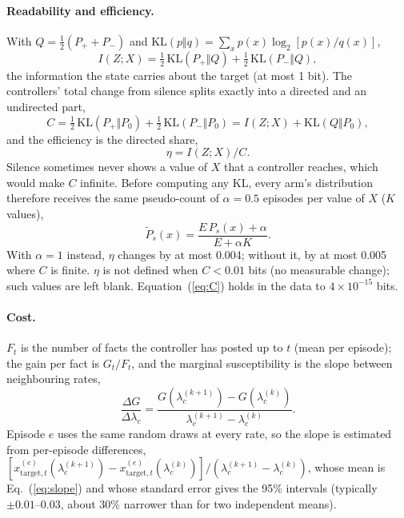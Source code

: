 \documentclass[10pt,a4paper]{article}
\begin{document}
\paragraph{Readability and efficiency.} With $Q = \frac12(P_+ + P_-)$ and $\mathrm{KL}(p\Vert q) = \sum_x p(x)\log_2[p(x)/q(x)]$,
\begin{equation}\label{eq:I}
I(Z;X) = \tfrac12\,\mathrm{KL}(P_+\Vert Q) + \tfrac12\,\mathrm{KL}(P_-\Vert Q),
\end{equation}
the information the state carries about the target (at most 1 bit). The controllers' total change from silence
splits exactly into a directed and an undirected part,
\begin{equation}\label{eq:C}
C = \tfrac12\,\mathrm{KL}(P_+\Vert P_0) + \tfrac12\,\mathrm{KL}(P_-\Vert P_0) = I(Z;X) + \mathrm{KL}(Q\Vert P_0),
\end{equation}
and the efficiency is the directed share,
\begin{equation}\label{eq:eta}
\eta = I(Z;X)/C .
\end{equation}
Silence sometimes never shows a value of $X$ that a controller reaches, which would make $C$ infinite. Before
computing any KL, every arm's distribution therefore receives the same pseudo-count of $\alpha = 0.5$ episodes per
value of $X$ ($K$ values),
\begin{equation}\label{eq:smooth}
\tilde P_s(x) = \frac{E\,P_s(x) + \alpha}{E + \alpha K}.
\end{equation}
With $\alpha = 1$ instead, $\eta$ changes by at most 0.004; without it, by at most 0.005 where $C$ is finite. $\eta$ is not defined when $C < 0.01$ bits (no measurable change);
such values are left blank. Equation~(\ref{eq:C}) holds in the data to $4\times10^{-15}$ bits.

\paragraph{Cost.} $F_t$ is the number of facts the controller has posted up to $t$ (mean per episode); the gain
per fact is $G_t/F_t$, and the marginal susceptibility is the slope between neighbouring rates,
\begin{equation}\label{eq:slope}
\frac{\Delta G}{\Delta\lambda_c} = \frac{G(\lambda_c^{(k+1)}) - G(\lambda_c^{(k)})}{\lambda_c^{(k+1)} - \lambda_c^{(k)}} .
\end{equation}
Episode $e$ uses the same random draws at every rate, so the slope is estimated from per-episode differences,
$[x^{(e)}_{\text{target},t}(\lambda_c^{(k+1)}) - x^{(e)}_{\text{target},t}(\lambda_c^{(k)})]/(\lambda_c^{(k+1)} -
\lambda_c^{(k)})$, whose mean is Eq.~(\ref{eq:slope}) and whose standard error gives the 95\% intervals (typically
$\pm0.01$--$0.03$, about 30\% narrower than for two independent means).
\end{document}
